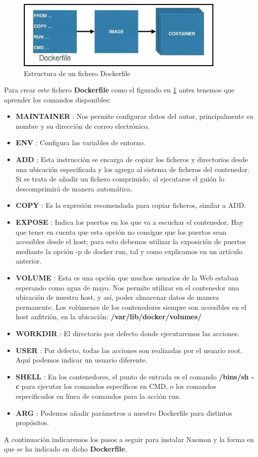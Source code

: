 \begin{figure}[H]
	\centering
	\includegraphics[width=0.9\textwidth]{imagenes/despliegue_naemon/dockerfile-image.png}
	\caption{Estructura de un fichero Dockerfile} \label{dockerfile}
\end{figure}
Para crear este fichero \textbf{Dockerfile} como el figurado en \ref{dockerfile} antes tenemos que aprender los comandos disponibles:
\begin{itemize}
	\item \textbf{MAINTAINER} : Nos permite configurar datos del autor, principalmente su nombre y su dirección de correo electrónico.
	\item \textbf{ENV} : Configura las variables de entorno.
	\item  \textbf{ADD} : Esta instrucción se encarga de copiar los ficheros y directorios desde una ubicación especificada y los agrega al sistema de ficheros del contenedor. Si se trata de añadir un fichero comprimido, al ejecutarse el guión lo descomprimirá de manera automática.
	\item  \textbf{COPY} : Es la expresión recomendada para copiar ficheros, similar a ADD.
	\item  \textbf{EXPOSE} : Indica los puertos en los que va a escuchar el contenedor. Hay que tener en cuenta que esta opción no consigue que los puertos sean accesibles desde el host; para esto debemos utilizar la exposición de puertos mediante la opción -p de docker run, tal y como explicamos en un artículo anterior.
	\item  \textbf{VOLUME} : Esta es una opción que muchos usuarios de la Web estaban esperando como agua de mayo. Nos permite utilizar en el contenedor una ubicación de nuestro host, y así, poder almacenar datos de manera permanente. Los volúmenes de los contenedores siempre son accesibles en el host anfitrión, en la ubicación: \textbf{/var/lib/docker/volumes/}
	\item  \textbf{WORKDIR} : El directorio por defecto donde ejecutaremos las acciones.
	\item  \textbf{USER} : Por defecto, todas las acciones son realizadas por el usuario root. Aquí podemos indicar un usuario diferente.
	\item  \textbf{SHELL} : En los contenedores, el punto de entrada es el comando \textbf{/bins/sh -c} para ejecutar los comandos específicos en CMD, o los comandos especificados en línea de comandos para la acción run.
	\item  \textbf{ARG} : Podemos añadir parámetros a nuestro Dockerfile para distintos propósitos.
\end{itemize}
A continuación indicaremos los pasos a seguir para instalar Naemon y la forma en que se ha indicado en dicho \textbf{Dockerfile}.
